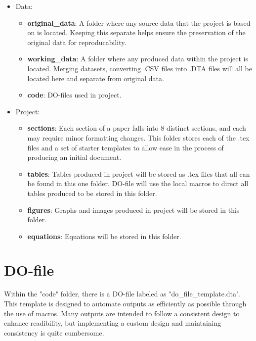 \documentclass[12pt]{article}
\begin{document}
\begin{itemize} 

\item Data:

\begin{itemize}
\item \textbf{original\_data}: A folder where any source data that the project is based on is located. Keeping this separate helps ensure the preservation of the original data for reproducability.

\item \textbf{working\_data}: 	A folder where any produced data within the project is located. Merging datasets, converting .CSV files into .DTA files will all be located here and separate from original data.

\item \textbf{code}: DO-files used in project.
\end{itemize}

\item Project:

\begin{itemize}

\item \textbf{sections}: Each section of a paper falls into 8 distinct sections, and each may require minor formatting changes. This folder stores each of the .tex files and a set of starter templates to allow ease in the process of producing an initial document.
\item \textbf{tables}: Tables produced in project will be stored as .tex files that all can be found in this one folder. DO-file will use the local macros to direct all tables produced to be stored in this folder.

\item \textbf{figures}: Graphs and images produced in project will be stored in this folder.

\item \textbf{equations}: Equations will be stored in this folder.

\end{itemize}

\end{itemize}

\section{DO-file}
Within the "code" folder, there is a DO-file labeled as "do\_file\_template.dta". This template is designed to automate outputs as efficiently as possible through the use of macros. Many outputs are intended to follow a consistent design to enhance readibility, but implementing a custom design and maintaining consistency is quite cumbersome. 
\end{document}
